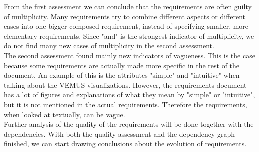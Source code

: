 \documentclass[a4paper,11pt]{article}
\begin{document}
			From the first assessment we can conclude that the requirements are often guilty of multiplicity. Many requirements try to combine different aspects or different cases into one bigger composed requirement, instead of specifying smaller, more elementary requirements. Since "and" is the strongest indicator of multiplicity, we do not find many new cases of multiplicity in the second assessment. \\
			The second assessment found mainly new indicators of vagueness. This is the case because some requirements are actually made more specific in the rest of the document. An example of this is the attributes "simple" and "intuitive" when talking about the VEMUS visualizations. However, the requirements document has a lot of figures and explanations of what they mean by "simple" or "intuitive", but it is not mentioned in the actual requirements. Therefore the requirements, when looked at textually, can be vague. \\
			Further analysis of the quality of the requirements will be done together with the dependencies. With both the quality assessment and the dependency graph finished, we can start drawing conclusions about the evolution of requirements. \\
\end{document}
